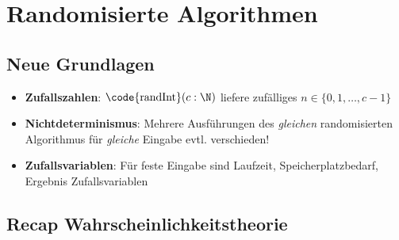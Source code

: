 \chapter{Randomisierte Algorithmen}

\newcommand{\E}{\text{\textbf{E}}}

\section{Neue Grundlagen}

\begin{itemize}
  \item \textbf{Zufallszahlen}: $ \text{\code{randInt}}(c : \N) $ liefere zufälliges $ n \in \{ 0, 1, \dots, c-1 \} $
  \item \textbf{Nichtdeterminismus}: Mehrere Ausführungen des \emph{gleichen} randomisierten Algorithmus für \emph{gleiche} Eingabe evtl. verschieden!
  \item \textbf{Zufallsvariablen}: Für feste Eingabe sind Laufzeit, Speicherplatzbedarf, Ergebnis Zufallsvariablen
\end{itemize}

\section{Recap Wahrscheinlichkeitstheorie}

